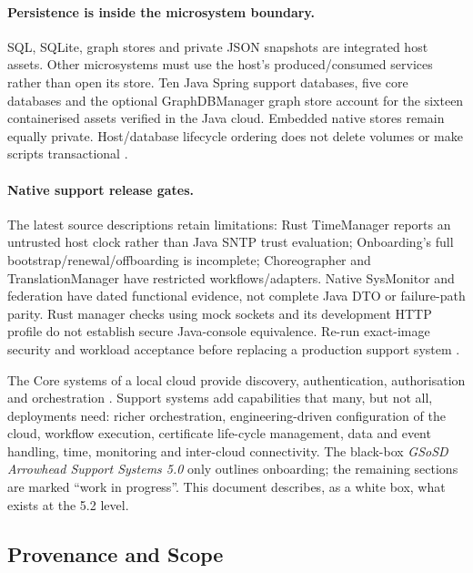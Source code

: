 \documentclass[a4paper]{arrowhead}
\begin{document}
\paragraph{Persistence is inside the microsystem boundary.}
SQL, SQLite, graph stores and private JSON snapshots are integrated host assets.
Other microsystems must use the host's produced/consumed services rather than
open its store. Ten Java Spring support databases, five core databases and the
optional GraphDBManager graph store account for the sixteen containerised assets
verified in the Java cloud. Embedded native stores remain equally private.
Host/database lifecycle ordering does not delete volumes or make scripts
transactional \cite{javaDatabaseAssets20261030}.

\paragraph{Native support release gates.}
The latest source descriptions retain limitations: Rust TimeManager reports an
untrusted host clock rather than Java SNTP trust evaluation; Onboarding's full
bootstrap/renewal/offboarding is incomplete; Choreographer and TranslationManager
have restricted workflows/adapters. Native SysMonitor and federation have dated
functional evidence, not complete Java DTO or failure-path parity. Rust manager
checks using mock sockets and its development HTTP profile do not establish secure
Java-console equivalence. Re-run exact-image security and workload acceptance
before replacing a production support system \cite{rustPackaging20261028}.



The Core systems of a local cloud provide discovery, authentication, authorisation and
orchestration \cite{gsosd50,gsosddcore}. Support systems add capabilities that many, but not all,
deployments need: richer orchestration, engineering-driven configuration of the cloud, workflow
execution, certificate life-cycle management, data and event handling, time, monitoring and
inter-cloud connectivity. The black-box \emph{GSoSD Arrowhead Support Systems 5.0}
\cite{gsosdsup50} only outlines onboarding; the remaining sections are marked ``work in
progress''. This document describes, as a white box, what exists at the 5.2 level.

\subsection{Provenance and Scope}
\label{sec:provenance}
\end{document}
